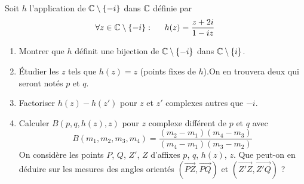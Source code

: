 Soit $h$ l'application de $\mathbb{C}\setminus\{-i\}$ dans $\mathbb{C}$ définie par
\begin{displaymath}
 \forall z \in \mathbb{C}\setminus\{-i\}:\hspace{0.5cm} h(z)=\frac{z+2i}{1-iz}
\end{displaymath}
\begin{enumerate}
 \item Montrer que $h$ définit une bijection de $\mathbb{C}\setminus\{-i\}$ dans $\mathbb{C}\setminus\{i\}$.
 \item \'Etudier les $z$ tels que $h(z)=z$ (points fixes de $h$).\newline On en trouvera deux qui seront notés $p$ et $q$.
 \item Factoriser $h(z)-h(z')$ pour $z$ et $z'$ complexes autres que $-i$.
 \item Calculer $B(p,q,h(z),z)$ pour $z$ complexe différent de $p$ et $q$ avec
\begin{displaymath}
 B(m_1,m_2,m_3,m_4) = \frac{(m_2-m_1)(m_4-m_3)}{(m_4-m_1)(m_3-m_2)}
\end{displaymath}
On considère les points $P$, $Q$, $Z'$, $Z$ d'affixes $p$, $q$, $h(z)$, $z$. Que peut-on en déduire sur les mesures des angles orientés $(\overrightarrow{P Z},\overrightarrow{P Q})$ et $(\overrightarrow{Z' Z},\overrightarrow{Z' Q})$ ?
\end{enumerate}
